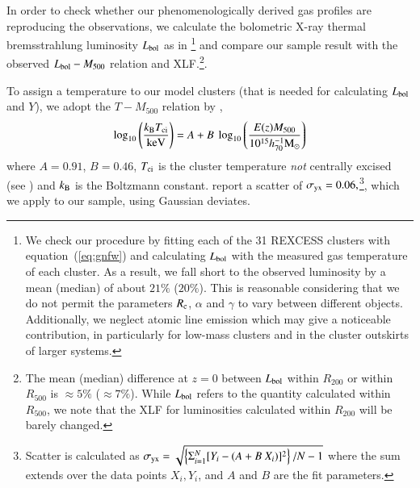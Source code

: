 \documentclass[traditabstract]{aa}
\begin{document}
In order to check whether our phenomenologically derived gas profiles are
reproducing the observations, we calculate the bolometric X-ray thermal
bremsstrahlung luminosity $L_{\rm{bol}}$ as in
\cite{1988xrec.book.....S}\footnote[5]{We check our procedure by fitting each of
  the 31 REXCESS clusters with equation~(\ref{eq:gnfw}) and calculating
  $L_{\rm{bol}}$ with the measured gas temperature of each cluster. As a result,
  we fall short to the observed luminosity by a mean (median) of about $21\%$
  ($20\%$). This is reasonable considering that we do not permit the parameters
  $R_{\rm{c}}$, $\alpha$ and $\gamma$ to vary between different
  objects. Additionally, we neglect atomic line emission which may give a
  noticeable contribution, in particularly for low-mass clusters and in the
  cluster outskirts of larger systems.} and compare our sample result with the
observed $L_{\rm{bol}} - M_{500}$ relation and XLF.\footnote[6]{The mean
  (median) difference at $z=0$ between $L_{\rm{bol}}$ within $R_{200}$ or within
  $R_{500}$ is $\approx 5\%$ ($\approx 7\%$). While $L_{\rm{bol}}$ refers to the
  quantity calculated within $R_{500}$, we note that the XLF for luminosities
  calculated within $R_{200}$ will be barely changed.}.

To assign a temperature to our model clusters (that is needed for calculating
$L_{\rm{bol}}$ and $Y$), we adopt the $T-M_{500}$ relation by
\cite{2010MNRAS.406.1773M},
\begin{equation}
\log_{10} \left( \frac{k_{\rm{B}}T_{\rm{ci}}}{\rm{keV}} \right) = 
A + B~\log_{10} \left( \frac{E(z) M_{500}}{10^{15} h_{70}^{-1} \rm{M_{\odot}}} \right)
\label{eq:temp}
\end{equation}
where $A=0.91$, $B=0.46$, $T_{\rm{ci}}$ is the cluster temperature \emph{not}
centrally excised (see \citealp{2010MNRAS.406.1773M}) and $k_{\rm{B}}$ is the
Boltzmann constant. \cite{2010MNRAS.406.1773M} report a scatter of
$\sigma_{\rm{yx}} = 0.06,$\footnote[7]{Scatter is calculated as
  $\sigma_{\rm{yx}} = \sqrt{ \left\{ \Sigma_{i=1}^{N} [Y_{i}-(A+B~X_{i})]^{2}\right\} /
    N-1}$ where the sum extends over the data points $X_{i}, Y_{i}$, and $A$ and $B$
  are the fit parameters.}, which we apply to our sample, using Gaussian
deviates.
\end{document}
